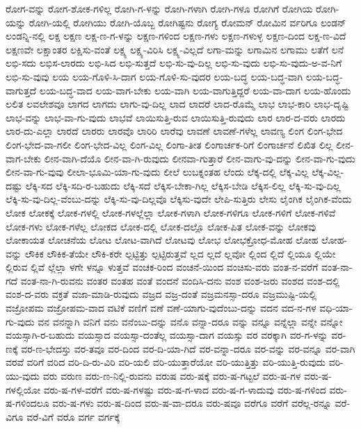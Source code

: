 {ರೋಗ-ವನ್ನು
ರೋಗ-ಶೋಕ-ಗಳಿಲ್ಲ
ರೋಗಿ-ಗ-ಳನ್ನು
ರೋಗಿ-ಗಳಾಗಿ
ರೋಗಿ-ಗಳೂ
ರೋಗಿಗೆ
ರೋಗಿಯ
ರೋಗಿ-ಯನ್ನು
ರೋಗಿ-ಯಲ್ಲಿ
ರೋಗಿಯು
ರೋಗಿ-ಯೊಬ್ಬ
ರೋಗಿಷ್ಟನು
ರೋಗ್ಯ
ರೋಮನ್
ರೋಮಿನ
ರ್ವರಿಗೂ
ಲಂಡನ್
ಲಂಡನ್ನಿ-ನಲ್ಲಿ
ಲಕ್ಷ
ಲಕ್ಷಣ
ಲಕ್ಷ-ಣ-ಗ-ಳನ್ನು
ಲಕ್ಷಣ-ಗಳಿಂದ
ಲಕ್ಷಣ-ಗಳು
ಲಕ್ಷಣ-ಗಳುಳ್ಳ
ಲಕ್ಷಣ-ದಿಂದ
ಲಕ್ಷ-ಣ-ವಿದೆ
ಲಕ್ಷಣವೇ
ಲಕ್ಷಾಂತರ
ಲಕ್ಷಿಸು-ವಂತೆ
ಲಕ್ಷ್ಯ
ಲಕ್ಷ್ಯ-ವಿರಿಸಿ
ಲಕ್ಷ್ಯ-ವಿಲ್ಲದೆ
ಲಗಾ-ಮನ್ನು
ಲಗಾಮಿನ
ಲಗಾಮು
ಲತೆಗೆ
ಲನೆ
ಲಭಿ-ಸದು
ಲಭಿಸ-ಲಾರದು
ಲಭಿ-ಸಿದ
ಲಭಿ-ಸುತ್ತದೆ
ಲಭಿ-ಸು-ವು-ದಿಲ್ಲ
ಲಭಿ-ಸು-ವುದು
ಲಭಿ-ಸು-ವುದು-ಅ-ವ-ನಿಗೆ
ಲಭಿ-ಸು-ವುವು
ಲಯ
ಲಯ-ಗೊಳಿ-ಸಿ-ದಾಗ
ಲಯ-ಗೊಳಿ-ಸು-ವುದರ
ಲಯ-ಬದ್ಧ
ಲಯ-ಬದ್ಧ-ವಾಗಿ
ಲಯ-ಬದ್ಧ-ವಾಗುತ್ತದೆ
ಲಯ-ಬದ್ಧ-ವಾದ
ಲಯ-ವಾಗ-ಬೇಕು
ಲಯ-ವಾಗಿ
ಲಯ-ವಾಗುತ್ತಿದ್ದರೆ
ಲಯ-ವಾ-ದಾಗ
ಲಯ-ಹೊಂದು
ಲಲಿತ
ಲವಲೇಶವೂ
ಲಾಗದ
ಲಾಗದು
ಲಾಗು-ವು-ದಿಲ್ಲ
ಲಾದ
ಲಾದರೆ
ಲಾದ-ರೊಮ್ಮೆ
ಲಾಭ
ಲಾಭ-ಕಾರಿ
ಲಾಭ-ದೃಷ್ಟಿ
ಲಾಭ-ವನ್ನು
ಲಾಭ-ವಾ-ಗು-ವುದು
ಲಾಭವೆ
ಲಾಯಿಸುತ್ತಿ-ರುವ
ಲಾಯಿಸುತ್ತಿ-ರುವುದು
ಲಾರ
ಲಾರ-ದ-ವರು
ಲಾರದು
ಲಾರ-ದು-ಎಲ್ಲಾ
ಲಾರದೆ
ಲಾರರು
ಲಾರವೊ
ಲಾರಿರಿ
ಲಾರೆವು
ಲಾವಣೆ
ಲಾವಣೆ-ಗಳೆಲ್ಲ
ಲಾವಣ್ಯ
ಲಿಂಗ
ಲಿಂಗ-ಭೇದ
ಲಿಂಗ-ಭೇದ-ವಾ-ಗಲೀ
ಲಿಂಗ-ಭೇದ-ವಿಲ್ಲ
ಲಿಂಗ-ವಿಲ್ಲ
ಲಿಂಗಾ-ತೀತ
ಲಿಂಗಾರ್ಚಕ-ರಿಗೆ
ಲಿಂಗಾರ್ಚನೆ
ಲಿಖಿತ
ಲಿಲ್ಲ
ಲೀನ-ವಾಗ-ಬೇಕು
ಲೀನ-ವಾಗಿ-ದೆಯೊ
ಲೀನ-ವಾ-ಗಿ-ರುವುದು
ಲೀನವಾ-ಗುತ್ತಾರೆ
ಲೀನ-ವಾಗು-ವು-ದನ್ನು
ಲೀನ-ವಾ-ಗು-ವುದು
ಲೀನ-ವಾ-ಗು-ವುವು
ಲೀಲಾ-ಭೂಮಿ-ಯಾ-ಗು-ವುದು
ಲೀಲೆ
ಲುಬಕ್ನಂತಹ
ಲೆಂದು
ಲೆಕ್ಕ-ದಲ್ಲಿ
ಲೆಕ್ಕ-ವಿಲ್ಲ
ಲೆಕ್ಕ-ವಿಲ್ಲ-ದಷ್ಟು
ಲೆಕ್ಕಿ-ಸದ
ಲೆಕ್ಕಿ-ಸದಿ-ರ-ಬಹುದು
ಲೆಕ್ಕಿ-ಸದೆ
ಲೆಕ್ಕಿಸ-ಬೇಕಾ-ಗಿಲ್ಲ
ಲೆಕ್ಕಿಸ-ಬೇಡಿ
ಲೆಕ್ಕಿಸ-ಲಿಲ್ಲ
ಲೆಕ್ಕಿ-ಸು-ವು-ದಿಲ್ಲ
ಲೆಕ್ಕಿ-ಸು-ವು-ದಿಲ್ಲ-ವೆಂಬು-ದನ್ನು
ಲೆಕ್ಕಿ-ಸು-ವು-ದಿಲ್ಲವೊ
ಲೆಕ್ಕಿಸು-ವುದೇ
ಲೇಪಿ-ಸುತ್ತಿರು
ಲೇಸು
ಲೈಂಗಿಕ
ಲೈಂಗಿಕ-ವೆಂದು
ಲೋಕ
ಲೋಕಕ್ಕೆ
ಲೋಕ-ಗಳಲ್ಲಿ
ಲೋಕ-ಗಳಲ್ಲೆಲ್ಲಾ
ಲೋಕ-ಗಳಾಗಿ
ಲೋಕ-ಗಳಿಗೂ
ಲೋಕ-ಗಳಿಗೆ
ಲೋಕ-ಗಳಿವೆ
ಲೋಕ-ಗಳು
ಲೋಕ-ಗಳೆಲ್ಲ
ಲೋಕದ
ಲೋಕ-ದಲ್ಲಿ
ಲೋಕ-ದಲ್ಲೊ
ಲೋಕ-ಪಿತ
ಲೋಕ-ವನ್ನು
ಲೋಕವು
ಲೋಕಾಯತ
ಲೋಚನೆಯ
ಲೋಟ
ಲೋಟ-ವಾಗಿದೆ
ಲೋಟವು
ಲೋಭ
ಲೋಭಕ್ರೋಧ-ಮೋಹ
ಲೋಹ
ಲೋಹ-ವನ್ನು
ಲೌಕಿಕ
ಲೌಕಿಕ-ತೆಯೇ
ಲೌಕಿ-ಕರೇ
ಲ್ಪಟ್ಟಿತ್ತು
ಲ್ಪಟ್ಟಿರುತ್ತವೆ
ಲ್ಲದ
ಲ್ಲದೆ
ಲ್ಲವೋ
ಲ್ಲಿಂದ
ಲ್ಲಿದೆ
ಲ್ಲಿಯೂ
ಲ್ಲಿಯೇ
ಲ್ಲಿರುವ
ಲ್ಲಿವೆ
ಲ್ಲೆಲ್ಲಾ
ಳಗೇ
ಳನ್ನೂ
ಳುತ್ತವೆ
ವಂಚಕ-ರಿಂದ
ವಂಚನೆ-ಯಿಂದ
ವಂಚಿಸು-ವರು
ವಂತ-ನ-ವರೆಗೆ
ವಂತ-ನಾ-ಗದೆ
ವಂತ-ನಾ-ಗಿ-ರುವನು
ವಂತರ
ವಂತಹ
ವಂತೆ
ವಂದನೆ
ವಂದಿಸಿ-ದನು
ವಂಶ
ವಂಶ-ಜರು
ವಂಶದ
ವಂಶ-ದಲ್ಲಿ
ವಂಶ-ದ-ವರು
ವಕ್ರತೆ
ವಜಾ-ಮಾಡಿ-ರುವುದು
ವಜ್ರದ
ವಜ್ರ-ದಂತೆ
ವಜ್ರಮನಸ್ಸಾ-ದರೂ
ವಜ್ರಮುಷ್ಟಿ-ಯಲ್ಲಿ
ವಜ್ರೋಪಮ
ವಜ್ರೋಪಮ-ವಾದ
ವಟಿಕೆ
ವಣಿಗೆ
ವಣೆ
ವಣೆ-ಯಾಗು-ವುದೆಂಬು-ದನ್ನು
ವದನ
ವದ-ನ-ಗಳ
ವಧಿ-ಯಾ-ಗು-ವುದು
ವನ
ವನನ್ನಾಗಿ
ವನಿಗೆ
ವನು
ವನೆಂಬು-ದನ್ನು
ವನೊ
ವನ್ನಾ-ದರೂ
ವನ್ನು
ವನ್ನೂ
ವನ್ನೆಲ್ಲಾ
ವನ್ನೇ
ವನ್ನೋ
ವಯಸ್ಸಾಗಿ-ರ-ಬಹುದು
ವಯಸ್ಸಾದ
ವಯಸ್ಸಾ-ದಂತೆಲ್ಲ
ವಯಸ್ಸಾ-ದಾಗ
ವಯಸ್ಸು
ವರ
ವರಕ್ಕಾಗಿ
ವರ-ಗ-ಳನ್ನು
ವರ-ಣಕ್ಕೆ
ವರ-ಣ-ಭೇದಸ್ತು
ವರ-ತವೂ
ವರ-ದಿಂದ
ವರ-ದಿ-ಯಾ-ಗಿದೆ
ವರ-ವನ್ನಾ-ದರೂ
ವರ-ವನ್ನು
ವರ-ವನ್ನೂ
ವರ-ವಾಗಿ
ವರವೆ
ವರಿಗೆ
ವರಿದ
ವರಿ-ದಿ-ರು-ವಿರಿ
ವರಿ-ಯಲಿ
ವರಿ-ಯುತ್ತಾರೆಯೋ
ವರಿ-ಯುತ್ತಿತ್ತು
ವರಿ-ಯುತ್ತಿ-ರುವುದು
ವರಿ-ಯು-ವುದು
ವರು
ವರುಣ
ವರು-ಣ-ನಿಲ್ಲಿ-ರುವನು
ವರುಷ
ವರು-ಷಕ್ಕೆ
ವರು-ಷ-ಗಟ್ಟಲೆ
ವರು-ಷ-ಗಳ
ವರು-ಷ-ಗಳಲ್ಲಿಯೋ
ವರು-ಷ-ಗಳ-ವರೆಗೆ
ವರು-ಷ-ಗಳಷ್ಟು
ವರು-ಷ-ಗ-ಳಾದ
ವರು-ಷ-ಗ-ಳಾದುವು
ವರು-ಷ-ಗಳಿಂದ
ವರು-ಷ-ಗಳಿಂದಲೂ
ವರು-ಷ-ಗಳು
ವರು-ಷ-ದಿಂದ
ವರು-ಷ-ವಾ-ದರೂ
ವರು-ಷವೂ
ವರೆಗೂ
ವರೆಗೆ
ವರೆಲ್ಲ-ರನ್ನೂ
ವರೆ-ವಿಗೂ
ವರೆ-ವಿಗೆ
ವರೊ
ವರ್ಗ
ವರ್ಗಕ್ಕೆ
}
